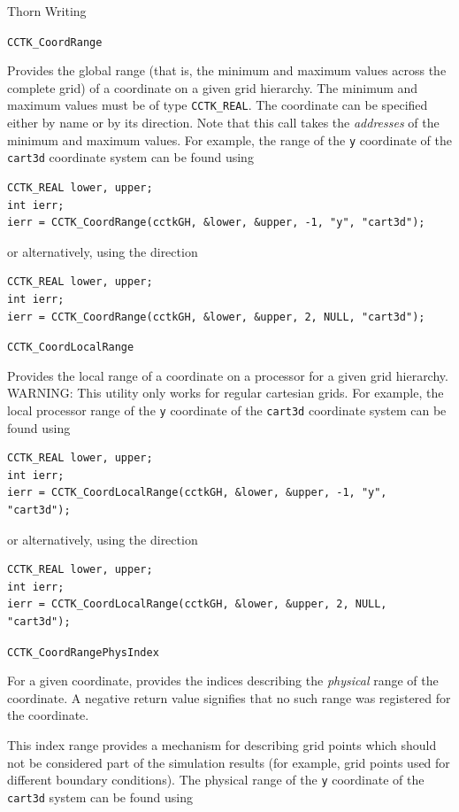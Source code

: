 \begin{cactuspart}{Thorn Writing}
\begin{Lentry}
\item[\texttt{CCTK\_CoordRange}]

Provides the global range (that is, the minimum and maximum values across
the complete grid) of a coordinate on a given grid hierarchy. The minimum and maximum values must be of type \texttt{CCTK\_REAL}. The
coordinate can be specified either by name or by its direction. Note that
this call takes the \emph{addresses} of the minimum and maximum values.
For example, the range of the \texttt{y} coordinate of the \texttt{cart3d}
coordinate system can be found using
%
\begin{verbatim}
CCTK_REAL lower, upper;
int ierr;
ierr = CCTK_CoordRange(cctkGH, &lower, &upper, -1, "y", "cart3d");
\end{verbatim}
or alternatively, using the direction
%
\begin{verbatim}
CCTK_REAL lower, upper;
int ierr;
ierr = CCTK_CoordRange(cctkGH, &lower, &upper, 2, NULL, "cart3d");
\end{verbatim}


\item[\texttt{CCTK\_CoordLocalRange}]

Provides the local range of a coordinate on a processor for a given
grid hierarchy. WARNING: This utility only works for regular
cartesian grids. For example, the local processor range of the
\texttt{y} coordinate of the \texttt{cart3d} coordinate system can be found using
%
\begin{verbatim}
CCTK_REAL lower, upper;
int ierr;
ierr = CCTK_CoordLocalRange(cctkGH, &lower, &upper, -1, "y", "cart3d");
\end{verbatim}
or alternatively, using the direction
%
\begin{verbatim}
CCTK_REAL lower, upper;
int ierr;
ierr = CCTK_CoordLocalRange(cctkGH, &lower, &upper, 2, NULL, "cart3d");
\end{verbatim}

\item[\texttt{CCTK\_CoordRangePhysIndex}]

For a given coordinate, provides the indices describing the \emph{physical}
range of the coordinate. A negative return value signifies that no such range
was registered for the coordinate.

This index range provides a mechanism for describing
grid points which should not be considered part of the simulation results (for example,
grid points used for different boundary conditions). The physical range of the
\texttt{y} coordinate of the \texttt{cart3d} system can be found using


\end{Lentry}
\end{cactuspart}
